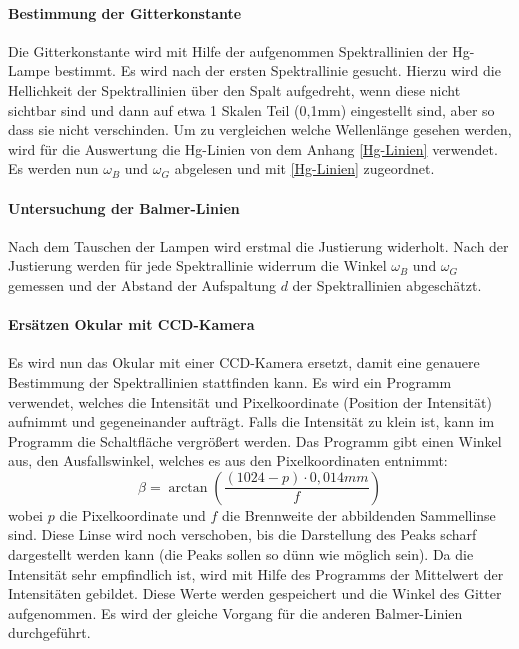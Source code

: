 \paragraph{Bestimmung der Gitterkonstante}

Die Gitterkonstante wird mit Hilfe der aufgenommen Spektrallinien der Hg-Lampe bestimmt.
Es wird nach der ersten Spektrallinie gesucht. 
Hierzu wird die Hellichkeit der Spektrallinien über den Spalt aufgedreht, wenn diese nicht sichtbar sind und dann auf etwa 1 Skalen Teil (0,1mm) eingestellt sind, aber so dass sie nicht verschinden.
Um zu vergleichen welche Wellenlänge gesehen werden, wird für die Auswertung die Hg-Linien von dem Anhang \cref{Hg-Linien} verwendet.
Es werden nun $\omega_B$ und $\omega_G$ abgelesen und mit \cref{Hg-Linien} zugeordnet.

\paragraph{Untersuchung der Balmer-Linien}
Nach dem Tauschen der Lampen wird erstmal die Justierung widerholt. 
Nach der Justierung werden für jede Spektrallinie widerrum die Winkel $\omega_B$ und $\omega_G$ gemessen und der Abstand der Aufspaltung $d$ der Spektrallinien abgeschätzt.

\paragraph{Ersätzen Okular mit CCD-Kamera}
Es wird nun das Okular mit einer CCD-Kamera ersetzt, damit eine genauere Bestimmung der Spektrallinien stattfinden kann. 
Es wird ein Programm verwendet, welches die Intensität und Pixelkoordinate (Position der Intensität) aufnimmt und gegeneinander aufträgt. 
Falls die Intensität zu klein ist, kann im Programm die Schaltfläche vergrößert werden.
Das Programm gibt einen Winkel aus, den Ausfallswinkel, welches es aus den Pixelkoordinaten entnimmt: 
\begin{equation}
    \beta = \arctan(\frac{(1024-p)\cdot0,014mm}{f})
\end{equation}
wobei $p$ die Pixelkoordinate und $f$ die Brennweite der abbildenden Sammellinse sind.
Diese Linse wird noch verschoben, bis die Darstellung des Peaks scharf dargestellt werden kann (die Peaks sollen so dünn wie möglich sein).
Da die Intensität sehr empfindlich ist, wird mit Hilfe des Programms der Mittelwert der Intensitäten gebildet. 
Diese Werte werden gespeichert und die Winkel des Gitter aufgenommen. 
Es wird der gleiche Vorgang für die anderen Balmer-Linien durchgeführt.

